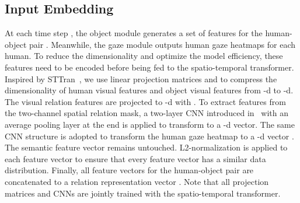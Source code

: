 \documentclass[times,twocolumn,final,authoryear]{elsarticle}
\begin{document}
\subsection{Input Embedding}
At each time step , the object module generates a set of features  for the human-object pair . Meanwhile, the gaze module outputs human gaze heatmaps  for each human. To reduce the dimensionality and optimize the model efficiency, these features need to be encoded before being fed to the spatio-temporal transformer. Inspired by STTran~\citep{hoi_v2:sttran}, we use linear projection matrices  and  to compress the dimensionality of human visual features  and object visual features  from -d to -d. The visual relation features  are projected to -d with . To extract features from the two-channel spatial relation mask, a two-layer CNN  introduced in~\citep{hoi_i2:neural_motifs} with an average pooling layer at the end is applied to transform   to a -d vector. The same CNN structure  is adopted to transform the human gaze heatmap  to a -d vector . The semantic feature vector  remains untouched. L2-normalization is applied to each feature vector to ensure that every feature vector has a similar data distribution. Finally, all feature vectors for the human-object pair  are concatenated to a relation representation vector . Note that all projection matrices and CNNs are jointly trained with the spatio-temporal transformer. 
\end{document}
